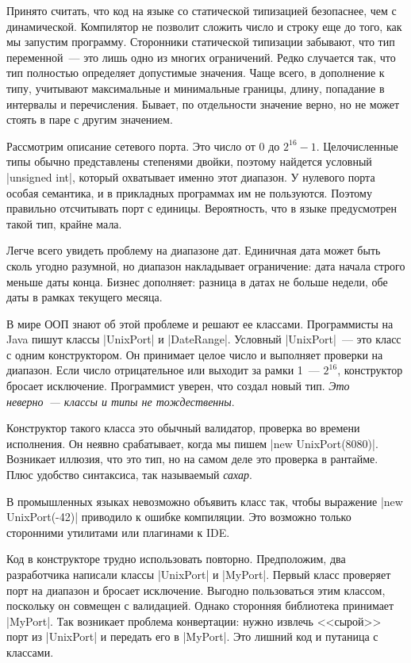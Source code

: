 Принято считать, что код на языке со статической типизацией безопаснее, чем с
динамической. Компилятор не позволит сложить число и строку еще до того, как мы
запустим программу. Сторонники статической типизации забывают, что тип
переменной~--- это лишь одно из многих ограничений. Редко случается так, что тип
полностью определяет допустимые значения. Чаще всего, в дополнение к типу,
учитывают максимальные и минимальные границы, длину, попадание в интервалы и
перечисления. Бывает, по отдельности значение верно, но не может стоять в паре с
другим значением.

Рассмотрим описание сетевого порта. Это число от 0 до $2^{16}-1$. Целочисленные
типы обычно представлены степенями двойки, поэтому найдется условный
\spverb|unsigned int|, который охватывает именно этот диапазон. У нулевого порта
особая семантика, и в прикладных программах им не пользуются. Поэтому правильно
отсчитывать порт с единицы. Вероятность, что в языке предусмотрен такой тип,
крайне мала.

Легче всего увидеть проблему на диапазоне дат. Единичная дата может быть сколь
угодно разумной, но диапазон накладывает ограничение: дата начала строго меньше
даты конца. Бизнес дополняет: разница в датах не больше недели, обе даты в
рамках текущего месяца.

В мире ООП знают об этой проблеме и решают ее классами. Программисты на Java
пишут классы \spverb|UnixPort| и \spverb|DateRange|. Условный
\spverb|UnixPort|~--- это класс с одним конструктором. Он принимает целое число
и выполняет проверки на диапазон. Если число отрицательное или выходит за рамки
1~--- $2^{16}$, конструктор бросает исключение. Программист уверен, что создал
новый тип. \emph{Это неверно~--- классы и типы не тождественны}.

Конструктор такого класса это обычный валидатор, проверка во времени
исполнения. Он неявно срабатывает, когда мы пишем \spverb|new UnixPort(8080)|.
Возникает иллюзия, что это тип, но на самом деле это проверка в рантайме. Плюс
удобство синтаксиса, так называемый \emph{сахар}.

В промышленных языках невозможно объявить класс так, чтобы выражение
\spverb|new UnixPort(-42)| приводило к ошибке компиляции. Это возможно только сторонними
утилитами или плагинами к IDE.

Код в конструкторе трудно использовать повторно. Предположим, два разработчика
написали классы \spverb|UnixPort| и \spverb|MyPort|. Первый класс проверяет порт
на диапазон и бросает исключение. Выгодно пользоваться этим классом, поскольку
он совмещен с валидацией. Однако сторонняя библиотека принимает
\spverb|MyPort|. Так возникает проблема конвертации: нужно извлечь <<сырой>>
порт из \spverb|UnixPort| и передать его в \spverb|MyPort|. Это лишний код и
путаница с классами.

